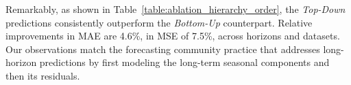 Remarkably, as shown in Table~\ref{table:ablation_hierarchy_order}, the \emph{Top-Down} predictions consistently outperform the \emph{Bottom-Up} counterpart. Relative improvements in MAE are 4.6\%, in MSE of 7.5\%, across horizons and datasets. Our observations match the forecasting community practice that addresses long-horizon predictions by first modeling the long-term seasonal components and then its residuals. %


